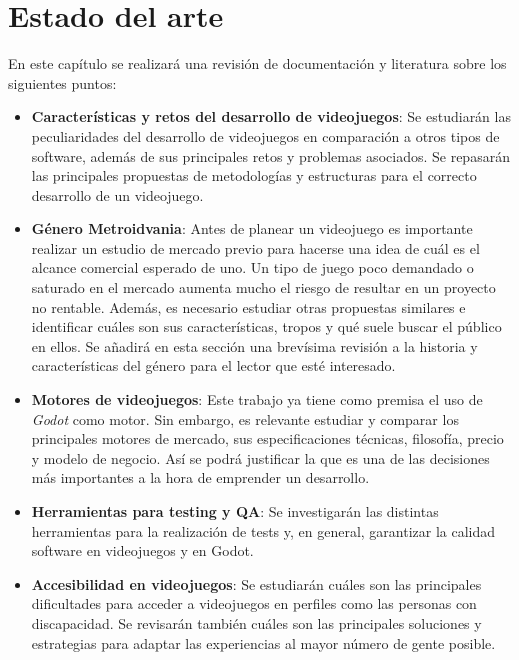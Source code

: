 \chapter{Estado del arte}
\label{chap:stateofart}

En este capítulo se realizará una revisión de documentación y literatura sobre los siguientes puntos:

\begin{itemize}

    \item \textbf{Características y retos del desarrollo de videojuegos}: Se estudiarán las peculiaridades del desarrollo de videojuegos en comparación a otros tipos de software, además de sus principales retos y problemas asociados. Se repasarán las principales propuestas de metodologías y estructuras para el correcto desarrollo de un videojuego.
    
    \item \textbf{Género Metroidvania}: Antes de planear un videojuego es importante realizar un estudio de mercado previo para hacerse una idea de cuál es el alcance comercial esperado de uno. Un tipo de juego poco demandado o saturado en el mercado aumenta mucho el riesgo de resultar en un proyecto no rentable. Además, es necesario estudiar otras propuestas similares e identificar cuáles son sus características, tropos y qué suele buscar el público en ellos. Se añadirá en esta sección una brevísima revisión a la historia y características del género para el lector que esté interesado.

    \item \textbf{Motores de videojuegos}: Este trabajo ya tiene como premisa el uso de \textit{Godot} como motor. Sin embargo, es relevante estudiar y comparar los principales motores de mercado, sus especificaciones técnicas, filosofía, precio y modelo de negocio. Así se podrá justificar la que es una de las decisiones más importantes a la hora de emprender un desarrollo.
    
    \item \textbf{Herramientas para testing y QA}: Se investigarán las distintas herramientas para la realización de tests y, en general, garantizar la calidad software en videojuegos y en Godot.
    
    \item \textbf{Accesibilidad en videojuegos}: Se estudiarán cuáles son las principales dificultades para acceder a videojuegos en perfiles como las personas con discapacidad. Se revisarán también cuáles son las principales soluciones y estrategias para adaptar las experiencias al mayor número de gente posible.

\end{itemize} 


